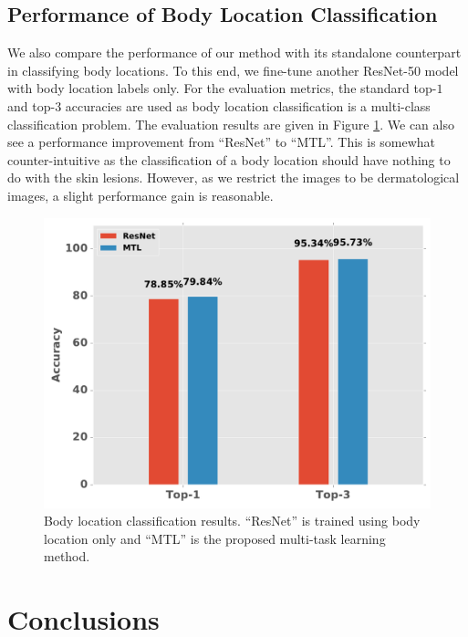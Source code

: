 \documentclass[letterpaper]{article}
\begin{document}
\subsection{Performance of Body Location Classification}

We also compare the performance of our method with its standalone counterpart
in classifying body locations. To this end, we fine-tune another ResNet-50 model
with body location labels only. For the evaluation metrics, the standard
top-$1$ and top-$3$ accuracies are used as body location classification is a
multi-class classification problem. The evaluation results are given in Figure
\ref{fig: body performance}. We can also see a performance improvement
from ``ResNet'' to ``MTL''. This is somewhat counter-intuitive as the classification
of a body location should have nothing to do with the skin lesions. However, as
we restrict the images to be dermatological images, a slight performance gain
is reasonable.

\begin{figure}[!ht]
  \centering
  \includegraphics[scale=0.38]{body_location_performance.pdf}
  \caption{Body location classification results. ``ResNet'' is trained using body
  location only and ``MTL'' is the proposed multi-task learning method.}
  \label{fig: body performance}
\end{figure}

\section{Conclusions}
\end{document}
